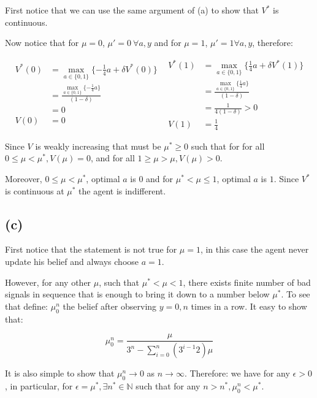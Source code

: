 \documentclass{article}
\begin{document}
First notice that we can use the same argument of (a) to show that $V^*$ is continuous.

Now notice that for $\mu = 0$, $\mu' = 0\ \forall a,y$ and for $\mu = 1$,
$\mu' = 1 \forall a,y$, therefore:

\[
  \begin{split}
    V^*(0) & =  \max_{a \in \{0, 1\}}\{- \frac{1}{4}a + \delta V^*(0) \} \\
           & = \frac{\max_{a \in \{0, 1\}}\{- \frac{1}{4}a\}}{(1 - \delta)} \\
           & = 0 \\
    V(0)   & = 0
  \end{split}
  \ \    
  \begin{split}
    V^*(1) & =  \max_{a \in \{0, 1\}}\{\frac{1}{4}a + \delta V^*(1) \} \\
           & = \frac{\max_{a \in \{0, 1\}}\{\frac{1}{4}a\}}{(1 - \delta)} \\
           & = \frac{1}{4(1 - \delta)} > 0 \\
    V(1)   & = \frac{1}{4}
  \end{split}
\]

Since $V$ is weakly increasing that must be $\mu^* \ge 0$ such that for for all 
$0 \le \mu < \mu^*, V(\mu) = 0$, and for all $1 \ge \mu > \mu, V(\mu) > 0$.

Moreover, $0 \le \mu < \mu^*$, optimal $a$ is $0$ and for $\mu^* < \mu \le 1$, 
optimal $a$ is $1$. Since $V^*$ is continuous at $\mu^*$ the agent is indifferent.

\subsection{(c)} %

First notice that the statement is not true for $\mu = 1$, in this case the agent
never update his belief and always choose $a = 1$.

However, for any other $\mu$, such that $\mu^* < \mu < 1$, there exists finite number of bad signals
in sequence that is enough to bring it down to a number below $\mu^*$. To see that define:
$\mu_0^n$ the belief after observing $y = 0, n$ times in a row. It easy to show that:

\[
  \mu_0^n = \frac{\mu}{3^n - \sum_{i = 0}^n(3^{i-1}2)\mu}
\]

It is also simple to show that $\mu_0^n \to 0$ as $n \to \infty$. Therefore:
we have for any $\epsilon > 0$, in particular, for $\epsilon = \mu^*, \exists
n^* \in \mathbb{N}$ such that for any $n > n^*, \mu_0^n < \mu^*$.
\end{document}
